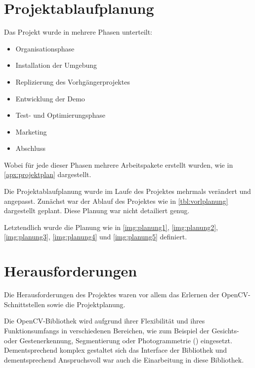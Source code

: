     \section{Projektablaufplanung}

        Das Projekt wurde in mehrere Phasen unterteilt:

        \begin{itemize}
            \item Organisationsphase
            \item Installation der Umgebung
            \item Replizierung des Vorhgängerprojektes
            \item Entwicklung der Demo
            \item Test- und Optimierungsphase
            \item Marketing
            \item Abschluss
        \end{itemize}

        Wobei für jede dieser Phasen mehrere Arbeitspakete erstellt wurden, wie
        in \ref{apx:projektplan} dargestellt.

        Die Projektablaufplanung wurde im Laufe des Projektes mehrmals verändert
        und angepasst.
        Zunächst war der Ablauf des Projektes wie in \autoref{tbl:vorlplanung}
        dargestellt geplant.
        Diese Planung war nicht detailiert genug.

        Letztendlich wurde die Planung wie in
        \autoref{img:planung1},
        \autoref{img:planung2},
        \autoref{img:planung3},
        \autoref{img:planung4} und
        \autoref{img:planung5}
        definiert.

    \section{Herausforderungen}

        Die Herausforderungen des Projektes waren vor allem das Erlernen der
        OpenCV-Schnittstellen sowie die Projektplanung.

        Die OpenCV-Bibliothek wird aufgrund ihrer Flexibilität und ihres
        Funktionsumfangs in verschiedenen Bereichen, wie zum Beispiel der
        Gesichts- oder Gestenerkennung, Segmentierung oder Photogrammetrie
        (\cite{wiki:opencv}) eingesetzt.
        Dementsprechend komplex gestaltet sich das Interface der Bibliothek und
        dementsprechend Anspruchsvoll war auch die Einarbeitung in diese
        Bibliothek.

